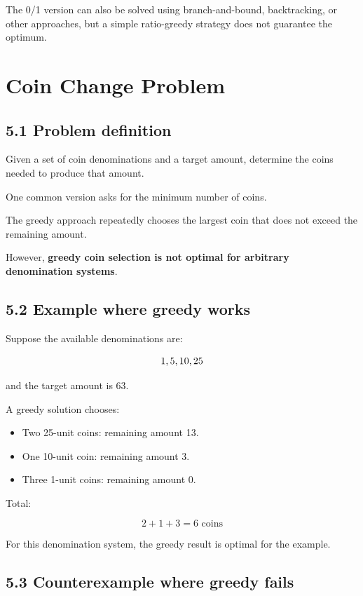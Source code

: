 The 0/1 version can also be solved using branch-and-bound, backtracking, or other approaches, but a simple ratio-greedy strategy does not guarantee the optimum.

\section{Coin Change Problem}

\subsection{5.1 Problem definition}

Given a set of coin denominations and a target amount, determine the coins needed to produce that amount.

One common version asks for the minimum number of coins.

The greedy approach repeatedly chooses the largest coin that does not exceed the remaining amount.

However, \textbf{greedy coin selection is not optimal for arbitrary denomination systems}.

\subsection{5.2 Example where greedy works}

Suppose the available denominations are:


\[
\\{1,5,10,25\\}
\]


and the target amount is 63.

A greedy solution chooses:

\begin{itemize}
    \item Two 25-unit coins: remaining amount 13.
    \item One 10-unit coin: remaining amount 3.
    \item Three 1-unit coins: remaining amount 0.
\end{itemize}

Total:


\[
2+1+3=\boxed{6\text{ coins}}
\]


For this denomination system, the greedy result is optimal for the example.

\subsection{5.3 Counterexample where greedy fails}

